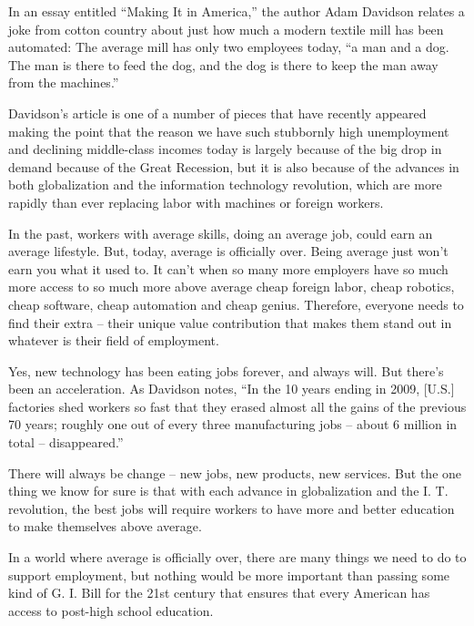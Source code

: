 In an essay entitled ``Making It in America,'' the author Adam Davidson relates a joke from cotton country about just how much a modern textile mill has been automated: The average mill has only two employees today, ``a man and a dog. The man is there to feed the dog, and the dog is there to keep the man away from the machines.''


Davidson's article is one of a number of pieces that have recently appeared making the point that the reason we have such stubbornly high unemployment and declining middle-class incomes today is largely because of the big drop in demand because of the Great Recession, but it is also because of the advances in both globalization and the information technology revolution, which are more rapidly than ever replacing labor with machines or foreign workers.


In the past, workers with average skills, doing an average job, could earn an average lifestyle. But, today, average is officially over. Being average just won't earn you what it used to. It can't when so many more employers have so much more access to so much more above average cheap foreign labor, cheap robotics, cheap software, cheap automation and cheap genius. Therefore, everyone needs to find their extra – their unique value contribution that makes them stand out in whatever is their field of employment.


Yes, new technology has been eating jobs forever, and always will. But there's been an acceleration. As Davidson notes, ``In the 10 years ending in 2009, [U.S.] factories shed workers so fast that they erased almost all the gains of the previous 70 years; roughly one out of every three manufacturing jobs – about 6 million in total – disappeared.''


There will always be change – new jobs, new products, new services. But the one thing we know for sure is that with each advance in globalization and the I. T. revolution, the best jobs will require workers to have more and better education to make themselves above average.


In a world where average is officially over, there are many things we need to do to support employment, but nothing would be more important than passing some kind of G. I. Bill for the 21st century that ensures that every American has access to post-high school education.